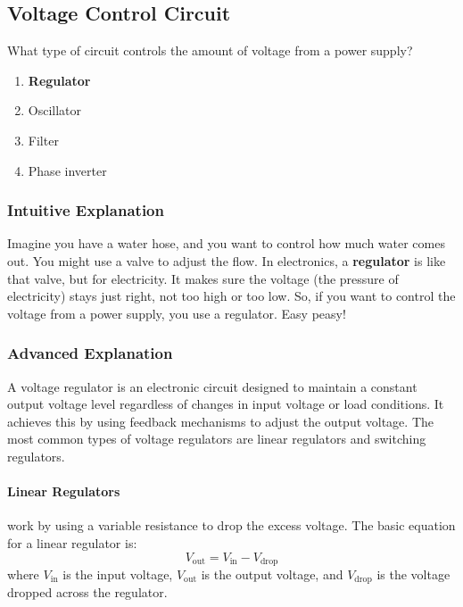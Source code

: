 \subsection{Voltage Control Circuit}
\label{T6D05}

\begin{tcolorbox}[colback=gray!10!white,colframe=black!75!black,title=T6D05]
What type of circuit controls the amount of voltage from a power supply?
\begin{enumerate}[label=\Alph*)]
    \item \textbf{Regulator}
    \item Oscillator
    \item Filter
    \item Phase inverter
\end{enumerate}
\end{tcolorbox}

\subsubsection{Intuitive Explanation}
Imagine you have a water hose, and you want to control how much water comes out. You might use a valve to adjust the flow. In electronics, a \textbf{regulator} is like that valve, but for electricity. It makes sure the voltage (the pressure of electricity) stays just right, not too high or too low. So, if you want to control the voltage from a power supply, you use a regulator. Easy peasy!

\subsubsection{Advanced Explanation}
A voltage regulator is an electronic circuit designed to maintain a constant output voltage level regardless of changes in input voltage or load conditions. It achieves this by using feedback mechanisms to adjust the output voltage. The most common types of voltage regulators are linear regulators and switching regulators.

\paragraph{Linear Regulators} work by using a variable resistance to drop the excess voltage. The basic equation for a linear regulator is:
\[
V_{\text{out}} = V_{\text{in}} - V_{\text{drop}}
\]
where \( V_{\text{in}} \) is the input voltage, \( V_{\text{out}} \) is the output voltage, and \( V_{\text{drop}} \) is the voltage dropped across the regulator.

